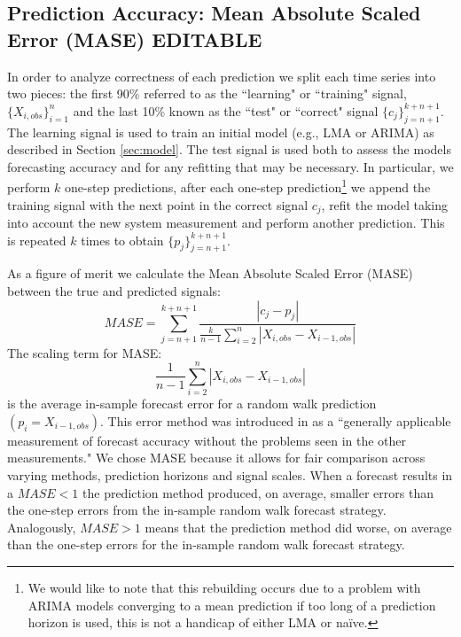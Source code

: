 




\subsection{Prediction Accuracy: Mean Absolute Scaled Error (MASE) {\color{blue} EDITABLE}}
\label{sec:accuracy}

In order to analyze correctness of each prediction we split each time series into two pieces: the first 90\% referred to as the ``learning" or ``training" signal, $\{X_{i,obs}\}_{i=1}^{n}$ and the last 10\% known as the ``test" or ``correct" signal $\{c_j\}_{j=n+1}^{k+n+1}$. The learning signal is used to train an initial model (e.g., LMA or ARIMA) as described in Section \ref{sec:model}. The test signal is used both to assess the models forecasting accuracy and for any refitting that may be necessary. In particular, we perform $k$ one-step predictions, after each one-step prediction\footnote{We would like to note that this rebuilding occurs due to a problem with ARIMA models converging to a mean prediction if too long of a prediction horizon is used, this is not a handicap of either LMA or na\"ive.} we append the training signal with the next point in the correct signal $c_j$, refit the model taking into account the new system measurement and perform another prediction. This is repeated $k$ times to obtain $\{p_j\}_{j=n+1}^{k+n+1}$.

As a figure of merit we calculate the Mean Absolute Scaled Error (MASE)\cite{MASE} between the true and predicted signals: 
$$MASE = \sum_{j=n+1}^{k+n+1}\frac{|c_j-p_j| }{\frac{k}{n-1}\sum^n_{i=2}|X_{i,obs}-X_{i-1,obs}|}$$
The scaling term for MASE:
$$\frac{1}{n-1}\sum^n_{i=2}|X_{i,obs}-X_{i-1,obs}|$$ 
is the average in-sample forecast error for a random walk prediction $(p_i=X_{i-1,obs})$. This error method was introduced in \cite{MASE} as a ``generally applicable measurement of forecast accuracy without the problems seen in the other measurements." We chose MASE because it allows for fair comparison across varying methods, prediction horizons and signal scales. When a forecast results in a $MASE<1$ the prediction method produced, on average, smaller errors than the one-step errors from the in-sample random walk forecast strategy. Analogously, $MASE>1$ means that the prediction method did worse, on average than the one-step errors for the in-sample random walk forecast strategy. 

